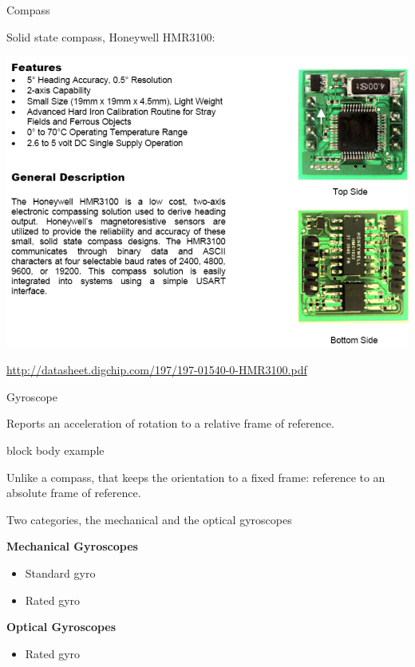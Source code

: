 \documentclass[compress]{beamer}
\begin{document}
\begin{frame}{Compass}

  Solid state compass, \eg Honeywell HMR3100:

    \begin{center}
        \includegraphics[width=0.8\linewidth]{compass}
    \end{center}
\small
\url{http://datasheet.digchip.com/197/197-01540-0-HMR3100.pdf}

\end{frame}

\begin{frame}{Gyroscope}

    Reports an acceleration of rotation to a relative frame of reference.

    \begin{beamercolorbox}{block body example}

        Unlike a compass, that keeps the orientation to a fixed frame: reference to an
        absolute frame of reference.

    \end{beamercolorbox}

    Two categories, the mechanical and the optical gyroscopes

    {\bf Mechanical Gyroscopes}

    \begin{itemize}

        \item Standard gyro
        \item Rated gyro
    \end{itemize}

    {\bf Optical Gyroscopes}

    \begin{itemize}

        \item Rated gyro
    \end{itemize}

\end{frame}
\end{document}
